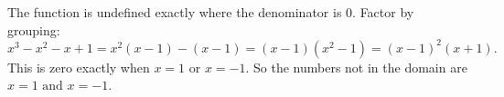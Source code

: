 The function is undefined exactly where the denominator is $0$. Factor by grouping:
\[
x^3-x^2-x+1=x^2(x-1)-(x-1)=(x-1)(x^2-1)=(x-1)^2(x+1).
\]
This is zero exactly when $x=1$ or $x=-1$. So the numbers not in the domain are $\boxed{x=1\text{ and }x=-1}$.
